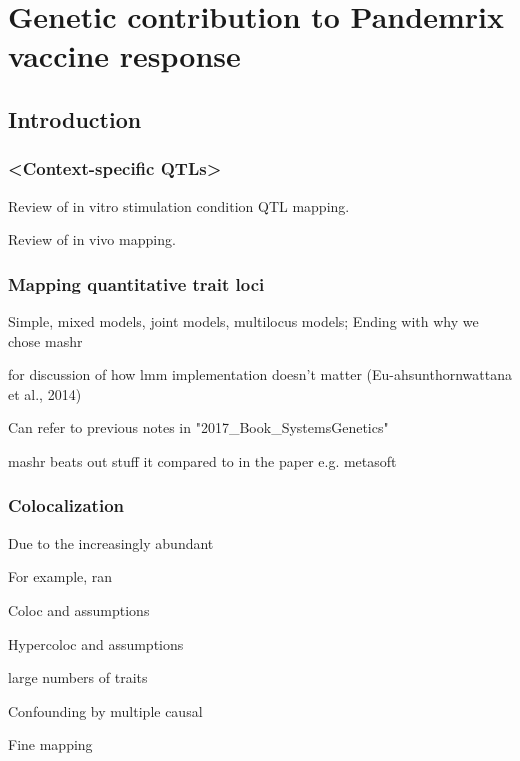 %
%

\chapter{Genetic contribution to Pandemrix vaccine response}

\section{Introduction}

\subsection{<Context-specific QTLs>}

Review of in vitro stimulation condition QTL mapping.

Review of in vivo mapping.

\subsection{Mapping quantitative trait loci}

Simple, mixed models, joint models, multilocus models; Ending with why we chose mashr

for discussion of how lmm implementation doesn't matter (Eu-ahsunthornwattana et al., 2014)

Can refer to previous notes in "2017\_Book\_SystemsGenetics"

mashr beats out stuff it compared to in the paper e.g. metasoft

\subsection{Colocalization}



Due to the increasingly abundant

For example, ran 

Coloc and assumptions

Hypercoloc and assumptions

large numbers of traits

Confounding by multiple causal

Fine mapping


